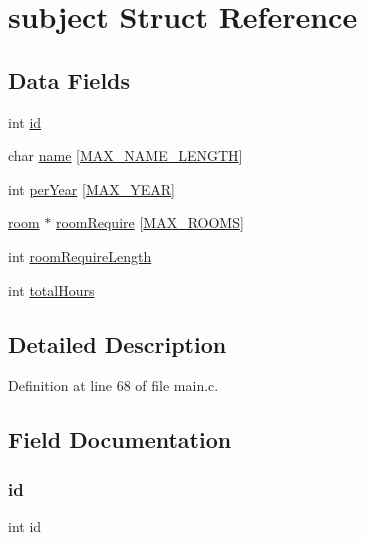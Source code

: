 \hypertarget{structsubject}{}\section{subject Struct Reference}
\label{structsubject}
\subsection*{Data Fields}
\begin{DoxyCompactItemize}
\item 
int \hyperlink{structsubject_a7441ef0865bcb3db9b8064dd7375c1ea}{id}
\item 
char \hyperlink{structsubject_ad50982abf9e9bbbc784f8f17fa25b1b2}{name} \mbox{[}\hyperlink{main_8c_a0c397a708cec89c74029582574516b30}{M\+A\+X\+\_\+\+N\+A\+M\+E\+\_\+\+L\+E\+N\+G\+TH}\mbox{]}
\item 
int \hyperlink{structsubject_a9f7950b8cf851cd516b4139193f73d43}{per\+Year} \mbox{[}\hyperlink{main_8c_a59bcbb5f6896e44dfd79fa63508cfec3}{M\+A\+X\+\_\+\+Y\+E\+AR}\mbox{]}
\item 
\hyperlink{structroom}{room} $\ast$ \hyperlink{structsubject_a5ae5b3c6b809ca65585611691557c8e5}{room\+Require} \mbox{[}\hyperlink{main_8c_a251d94cd24a2ca3369fc3f8eca8c19ae}{M\+A\+X\+\_\+\+R\+O\+O\+MS}\mbox{]}
\item 
int \hyperlink{structsubject_afb17ea87eab6c072f053b2e6c390d873}{room\+Require\+Length}
\item 
int \hyperlink{structsubject_aaa60bc5447f40a6adeacbf85c02b69e2}{total\+Hours}
\end{DoxyCompactItemize}


\subsection{Detailed Description}


Definition at line 68 of file main.\+c.



\subsection{Field Documentation}
\hypertarget{structsubject_a7441ef0865bcb3db9b8064dd7375c1ea}{}\label{structsubject_a7441ef0865bcb3db9b8064dd7375c1ea} 
\subsubsection{\texorpdfstring{id}{id}}
{\footnotesize\ttfamily int id}



